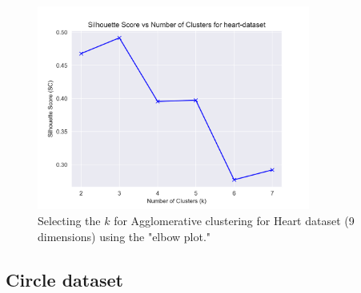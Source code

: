 \begin{figure}[H]
  \includegraphics[width=0.8\textwidth]{Appendix/parameter-selection/heart-dataset_agglomerative_optimal_cluster_9.png}
  \caption{Selecting the $k$ for Agglomerative clustering for Heart dataset (9 dimensions) using the "elbow plot."}
  \label{hyperparameters:agglomerative-heart-dataset-9d}
\end{figure}
\newpage

\subsection{Circle dataset}

